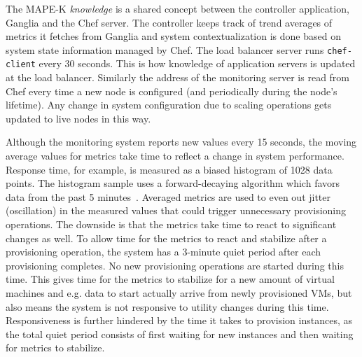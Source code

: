 \documentclass[english]{tktltiki2}
\theoremstyle{definition}
\theoremstyle{remark}
\begin{document}
The MAPE-K \textit{knowledge} is a shared concept between the controller
application, Ganglia and the Chef server. The controller keeps track of trend
averages of metrics it fetches from Ganglia and system contextualization is done
based on system state information managed by Chef. The load balancer server runs
\texttt{chef-client} every 30 seconds. This is how knowledge of application
servers is updated at the load balancer. Similarly the address of the monitoring
server is read from Chef every time a new node is configured (and periodically
during the node's lifetime). Any change in system configuration due to scaling
operations gets updated to live nodes in this way.

Although the monitoring system reports new values every 15 seconds, the moving
average values for metrics take time to reflect a change in system
performance. Response time, for example, is measured as a biased histogram of
1028 data points. The histogram sample uses a forward-decaying algorithm which
favors data from the past 5
minutes~\cite{forwardDecayHistogram}\cite{codahaleHistogram}. Averaged metrics
are used to even out jitter (oscillation) in the measured values that could
trigger unnecessary provisioning operations. The downside is that the metrics
take time to react to significant changes as well. To allow time for the
metrics to react and stabilize after a provisioning operation, the system has
a 3-minute quiet period after each provisioning completes. No new provisioning
operations are started during this time. This gives time for the metrics to
stabilize for a new amount of virtual machines and e.g. data to start actually
arrive from newly provisioned VMs, but also means the system is not responsive
to utility changes during this time. Responsiveness is further hindered by the
time it takes to provision instances, as the total quiet period consists of
first waiting for new instances and then waiting for metrics to stabilize.
\end{document}
